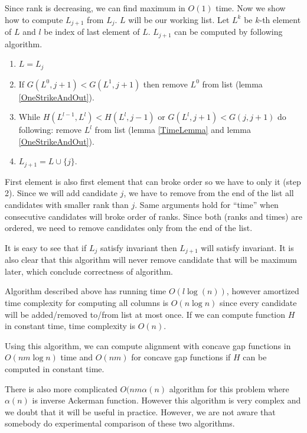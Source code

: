 Since rank is decreasing, we can find maximum in $O(1)$ time. Now we show how
to compute $L_{j+1}$ from $L_j$. $L$ will be our working list.
Let $L^k$ be $k$-th element of $L$ and $l$ be index of last element of $L$. 
$L_{j+1}$ can be computed by following algorithm.
\begin{enumerate}
\item $L=L_j$
\item If $G(L^0,j+1)< G(L^1,j+1)$ then remove $L^0$ from
list (lemma \ref{OneStrikeAndOut}).
\item While $H(L^{l-1},L^{l})<H(L^l,j-1)$ or $G(L^l,j+1)<G(j,j+1)$ do following: remove $L^l$ from list (lemma
\ref{TimeLemma} and lemma \ref{OneStrikeAndOut}).
\item $L_{j+1}=L\cup\{j\}$.
\end{enumerate}
First element is also first element that can broke order so we have to only it
(step 2). Since we will add candidate $j$, we have to remove from the end of the
list all candidates with smaller rank than $j$. Same arguments hold for ``time''
when consecutive candidates will broke order of ranks. Since both (ranks and
times) are ordered, we need to remove candidates only from the end of the list.

It is easy to see that if $L_j$ satisfy invariant then $L_{j+1}$ will satisfy
invariant. It is also clear that this algorithm will never remove candidate that
will be maximum later, which conclude correctness of algorithm.

Algorithm described above has running time $O(l\log(n))$, however amortized time
complexity for computing all columns is $O(n\log n)$ since every candidate will
be added/removed to/from list at most once. If we can compute function $H$ in
constant time, time complexity is $O(n)$.

Using this algorithm, we can compute alignment with concave gap functions in
$O(nm\log n)$ time and $O(nm)$ for concave gap functions if $H$ can be computed
in constant time.

There is also more complicated $O(nm\alpha(n)$ algorithm for this problem
\cite{Klawe1990} where $\alpha(n)$ is inverse Ackerman function. However this algorithm
is very complex and we doubt that it will be useful in practice. However, we are
not aware that somebody do experimental comparison of these two algorithms.






